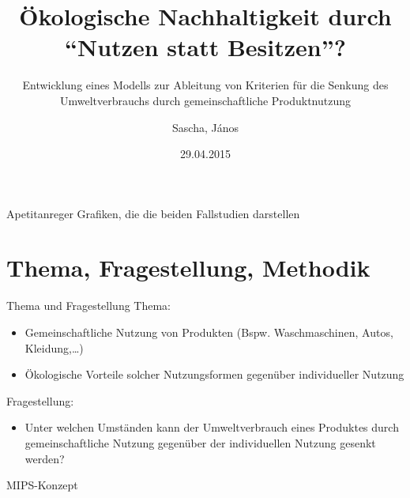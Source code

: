 \documentclass[beamer, xcolor=table]{beamer}
\title{Ökologische Nachhaltigkeit durch \\ \enquote{Nutzen statt Besitzen}?}
\subtitle{{\small Entwicklung eines Modells zur Ableitung von Kriterien für die Senkung des Umweltverbrauchs durch gemeinschaftliche Produktnutzung}}
\author{Sascha, János}
\date{29.04.2015}
\begin{document}
\frame{\titlepage}


\begin{frame}{Apetitanreger}
    Grafiken, die die beiden Fallstudien darstellen
\end{frame}
\section{Thema, Fragestellung, Methodik}

	\begin{frame}{Thema und Fragestellung}
        Thema: 
        \begin{itemize}
            \item Gemeinschaftliche Nutzung von Produkten (Bspw. Waschmaschinen,
                Autos, Kleidung,\dots)
            \item Ökologische Vorteile solcher Nutzungsformen gegenüber
                individueller Nutzung
        \end{itemize}

        \begin{block}{Fragestellung:}
            \begin{itemize}
                \item Unter welchen Umständen kann der Umweltverbrauch eines Produktes durch gemeinschaftliche Nutzung gegenüber der individuellen Nutzung gesenkt werden?
            \end{itemize}
        \end{block}
	\end{frame}
	
	\begin{frame}{MIPS-Konzept}
	\end{frame}
\end{document}
